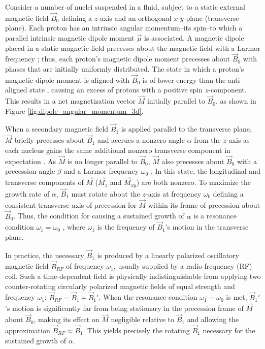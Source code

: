 \documentclass[11pt]{article}
\begin{document}
Consider a number of
nuclei suspended in a fluid, subject to a static external
magnetic field $\vec{B}_0$ defining a $z$-axis and an orthogonal
$x$-$y$-plane (transverse plane). Each proton has an
intrinsic angular momentum--its spin--to which a parallel intrinsic magnetic
dipole moment $\vec{\mu}$ is associated.
A magnetic dipole placed in a static magnetic field
precesses about the magnetic
field with a Larmor frequency \cite{young, knight, harris};
thus, each proton's magnetic
dipole moment
precesses about
$\vec{B}_0$ with phases that are initially uniformly distributed. The
state in which a proton's magnetic dipole moment is aligned with
$\vec B_0$ is of lower energy than the anti-aligned state
\cite{young, knight, harris}, causing an
excess of protons with a positive spin $z$-component. This results in a
net magnetization vector $\vec{M}$ initially parallel to $\vec{B}_0$, as
shown in Figure \ref{fig:dipole_angular_momentum_3d}.

When a secondary
magnetic field $\vec{B}_1$ is applied parallel to the transverse
plane, $\vec M$ briefly precesses about $\vec{B}_1$ and accrues a nonzero
angle $\alpha$ from the $z$-axis as each nucleus gains the same
additional nonzero transverse component in expectation \cite{sakurai,
harris, mel}. As
$\vec M$ is no longer parallel to
$\vec{B}_0$, $\vec M$ also precesses about $\vec{B}_0$ with a precession
angle $\beta$ and a Larmor frequency $\omega_0$ \cite{young, knight,
harris}. In this state, the
longitudinal and transverse components of $\vec M$ ($\vec M_z$ and
$\vec M_{xy}$) are both nonzero.
To maximize the growth rate of $\alpha$, $\vec B_1$ must rotate about the
$z$-axis at frequency $\omega_0$ defining a consistent transverse axis of
precession for $\vec M$ within its frame of precession about $\vec B_0$. Thus,
the condition for causing a sustained growth of $\alpha$ is a resonance
condition $\omega_1 = \omega_0$ \cite{young, knight}, where $\omega_1$ is the
frequency of $\vec B_1$'s motion in the transverse plane.

In practice, the necessary $\vec B_1$ is produced by a linearly
polarized oscillatory magnetic field $\vec B_{RF}$  of frequency
$\omega_1$, usually supplied by a radio frequency (RF) coil. Such a
time-dependent field is physically indistinguishable
from applying two counter-rotating circularly polarized magnetic
fields of equal strength
and frequency $\omega_1$: $\vec B_{RF} = \vec B_1 + \vec B_1'$. When
the resonance condition $\omega_1 = \omega_0$ is met, $\vec B_{1}'$'s
motion is significantly
far from being stationary in the precession frame of $\vec M$ about $\vec
B_0$, making its effect on $\vec M$ negligible relative to $\vec B_1$
and allowing the approximation $\vec B_{RF} \approx
\vec B_1$. This yields precisely the rotating $\vec B_1$ necessary
for the sustained growth of $\alpha$.
\end{document}
